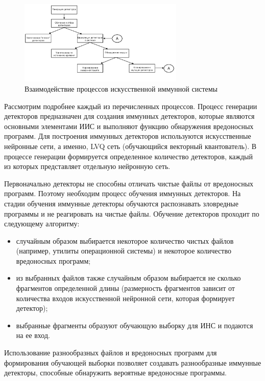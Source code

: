 \documentclass[bachelor, och, referat]{template}
\begin{document}
\begin{figure}[H]
    \centering
    \includegraphics[width=0.7\textwidth]{pics/1.png}
    \caption{Взаимодействие процессов искусственной иммунной системы}
    \label{s1}
\end{figure} 

Рассмотрим подробнее каждый из перечисленных процессов.
Процесс генерации детекторов предназначен для создания иммунных
детекторов, которые являются основными элементами ИИС и выполняют
функцию обнаружения вредоносных программ. Для построения иммун­ных 
детекторов используются искусственные нейронные сети, а именно, 
LVQ сеть (обучающийся векторный квантователь). В процессе ге­нерации 
формируется определенное количество детекторов, каждый из
которых представляет отдельную нейронную сеть.

Первоначально детекторы не способны отличать чистые файлы от вре­доносных 
программ. Поэтому необходим процесс обучения иммунных
детекторов. На стадии обучения иммунные детекторы обучаются распознавать 
зловредные программы и не реагировать на чистые файлы. Обу­чение 
детекторов проходит по следующему алгоритму:

\begin{itemize}
    \item случайным образом выбирается некоторое количество чистых фай­лов 
    (например, утилиты операционной системы) и некоторое количество
    вредоносных программ;
    \item из выбранных файлов также случайным образом выбирается не­
    сколько фрагментов определенной длины (размерность фрагментов зави­сит 
    от количества входов искусственной нейронной сети, которая форми­рует 
    детектор);
    \item выбранные фрагменты образуют обучающую выборку для ИНС и
    подаются на ее вход.
\end{itemize}

Использование разнообразных файлов и вредоносных программ для
формирования обучающей выборки позволяет создавать разнообразные
иммунные детекторы, способные обнаружить вероятные вредоносные
программы.
\end{document}
